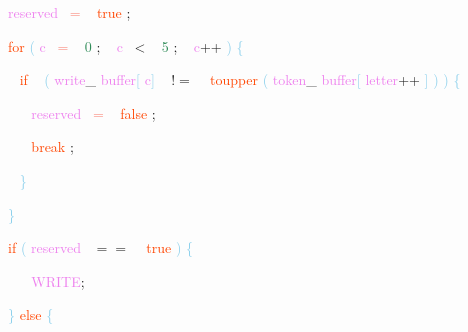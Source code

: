\documentclass[8, usernames, dvipsnames]{beamer}
\begin{document}
\begin{frame}
\textcolor{White}{\   }
\textcolor{White}{\   }
\textcolor{White}{\   }
\textcolor{Violet}{reserved}\textcolor{White}{\ }
\textcolor{Salmon}{=}
\textcolor{White}{\ }
\textcolor{OrangeRed}{true}
\textcolor{Sepia}{;}

 \textcolor{White}{\   }
\textcolor{White}{\   }
\textcolor{White}{\   }
\textcolor{OrangeRed}{for}
\textcolor{SkyBlue}{(}
\textcolor{Violet}{c}\textcolor{White}{\ }
\textcolor{Salmon}{=}
\textcolor{White}{\ }
\textcolor{SeaGreen}{0}
\textcolor{Sepia}{;}
\textcolor{White}{\ }
\textcolor{Violet}{c}\textcolor{White}{\ }
\textcolor{OliveGreen}{\textless}
\textcolor{White}{\ }
\textcolor{SeaGreen}{5}
\textcolor{Sepia}{;}
\textcolor{White}{\ }
\textcolor{Violet}{c}\textcolor{Apricot}{++}
\textcolor{SkyBlue}{)}
\textcolor{SkyBlue}{\{ }

 \textcolor{White}{\   }
\textcolor{White}{\   }
\textcolor{White}{\   }
\textcolor{White}{\   }
\textcolor{OrangeRed}{if}
\textcolor{White}{\ }
\textcolor{SkyBlue}{(}
\textcolor{Violet}{write}\textcolor{Sepia}{\_}
\textcolor{Violet}{buffer}\textcolor{SkyBlue}{[}
\textcolor{Violet}{c}\textcolor{SkyBlue}{]}
\textcolor{White}{\ }
\textcolor{OliveGreen}{$!=$}
\textcolor{White}{\ }
\textcolor{OrangeRed}{toupper}
\textcolor{SkyBlue}{(}
\textcolor{Violet}{token}\textcolor{Sepia}{\_}
\textcolor{Violet}{buffer}\textcolor{SkyBlue}{[}
\textcolor{Violet}{letter}\textcolor{Apricot}{++}
\textcolor{SkyBlue}{]}
\textcolor{SkyBlue}{)}
\textcolor{SkyBlue}{)}
\textcolor{SkyBlue}{\{ }

 \textcolor{White}{\   }
\textcolor{White}{\   }
\textcolor{White}{\   }
\textcolor{White}{\   }
\textcolor{White}{\   }
\textcolor{Violet}{reserved}\textcolor{White}{\ }
\textcolor{Salmon}{=}
\textcolor{White}{\ }
\textcolor{OrangeRed}{false}
\textcolor{Sepia}{;}

 \textcolor{White}{\   }
\textcolor{White}{\   }
\textcolor{White}{\   }
\textcolor{White}{\   }
\textcolor{White}{\   }
\textcolor{OrangeRed}{break}
\textcolor{Sepia}{;}

 \textcolor{White}{\   }
\textcolor{White}{\   }
\textcolor{White}{\   }
\textcolor{White}{\   }
\textcolor{SkyBlue}{\} }

 \textcolor{White}{\   }
\textcolor{White}{\   }
\textcolor{White}{\   }
\textcolor{SkyBlue}{\} }

 \textcolor{White}{\   }
\textcolor{White}{\   }
\textcolor{White}{\   }
\textcolor{OrangeRed}{if}
\textcolor{SkyBlue}{(}
\textcolor{Violet}{reserved}\textcolor{White}{\ }
\textcolor{OliveGreen}{$==$}
\textcolor{White}{\ }
\textcolor{OrangeRed}{true}
\textcolor{SkyBlue}{)}
\textcolor{SkyBlue}{\{ }

 \textcolor{White}{\   }
\textcolor{White}{\   }
\textcolor{White}{\   }
\textcolor{White}{\   }
\textcolor{OrangeRed}{	}
\textcolor{White}{\ }
\textcolor{Violet}{WRITE}\textcolor{Sepia}{;}

 \textcolor{White}{\   }
\textcolor{White}{\   }
\textcolor{White}{\   }
\textcolor{SkyBlue}{\} }
\textcolor{OrangeRed}{else}
\textcolor{SkyBlue}{\{ }

 \end{frame}
\end{document}
